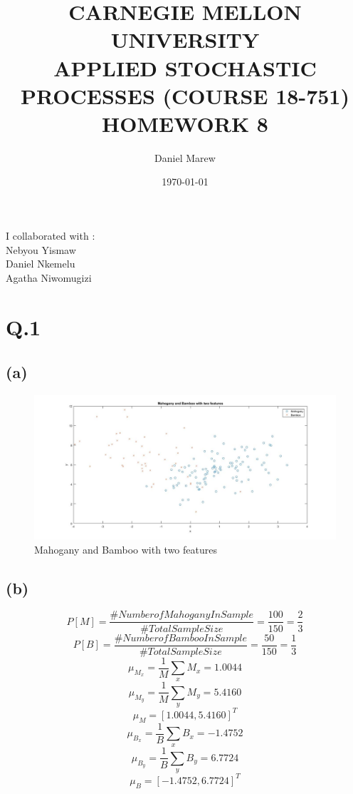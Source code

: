 \documentclass[a4paper,11pt]{article}
\begin{document}
\title{\color{red}CARNEGIE MELLON UNIVERSITY\\
APPLIED STOCHASTIC PROCESSES  (COURSE 18-751)\\
HOMEWORK 8}
\author{Daniel Marew}
\date{\today}
\clearpage\maketitle

\thispagestyle{empty}
\newpage
I collaborated with :\\
\hspace*{6cm}
Nebyou Yismaw\\
\hspace*{6cm}
Daniel    Nkemelu\\
\hspace*{6cm}
Agatha Niwomugizi
\thispagestyle{empty}
\newpage
\clearpage
\setcounter{page}{1}
\section*{Q.1}
\subsection*{(a)}
\begin{figure}[h]
  \hspace*{-6cm}
   \includegraphics[scale=0.5]{q1_a}
   \caption{Mahogany and Bamboo with two features}\label{fig:q1_a}
\end{figure}
\subsection*{(b)}
$$P[M] = \frac{\#Number of Mahogany In Sample}{\#Total Sample Size} = \frac{100}{150}=\frac{2}{3}$$
$$P[B] = \frac{\#Number of Bamboo In Sample}{\#Total Sample Size} = \frac{50}{150}=\frac{1}{3}$$
$$\mu_{M_x} =\frac{1}{M} \sum_{x}^{}M_x = 1.0044$$
$$\mu_{M_y} =\frac{1}{M} \sum_{y}^{}M_y = 5.4160$$
$$\mu_M = [1.0044,5.4160]^T$$
$$\mu_{B_x} =\frac{1}{B} \sum_{x}^{}B_x = -1.4752$$
$$\mu_{B_y} =\frac{1}{B} \sum_{y}^{}B_y =  6.7724$$
$$\mu_B = [-1.4752,6.7724]^T$$
\end{document}
